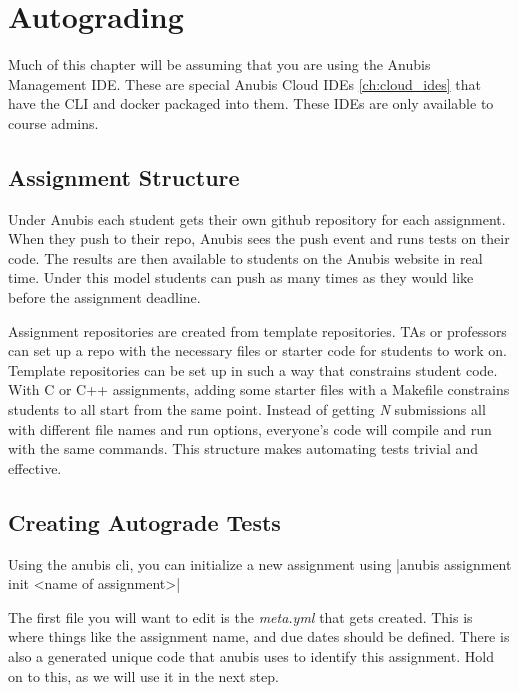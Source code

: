 \chapter{Autograding}\label{ch:assignments}

Much of this chapter will be assuming that you are using the Anubis Management IDE. These are special
Anubis Cloud IDEs \ref{ch:cloud_ides} that have the CLI and docker packaged into them. These
IDEs are only available to course admins.

\section{Assignment Structure}\label{sec:assignment-structure}

Under Anubis each student gets their own github repository for each assignment.
When they push to their repo, Anubis sees the push event and runs tests on their code.
The results are then available to students on the Anubis website in real time.
Under this model students can push as many times as they would like before the assignment deadline.

Assignment repositories are created from template repositories.
TAs or professors can set up a repo with the necessary files or starter code for students to work on.
Template repositories can be set up in such a way that constrains student code.
With C or C++ assignments, adding some starter files with a Makefile constrains students
to all start from the same point.
Instead of getting \textit{N} submissions all with different file names and run options,
everyone's code will compile and run with the same commands.
This structure makes automating tests trivial and effective.

\section{Creating Autograde Tests}\label{sec:creating-autograde-tests}

Using the anubis cli, you can initialize a new assignment using
|anubis assignment init <name of assignment>|

The first file you will want to edit is the \textit{meta.yml} that gets created.
This is where things like the assignment name, and due dates should be defined.
There is also a generated unique code that anubis uses to identify this assignment.
Hold on to this, as we will use it in the next step.

